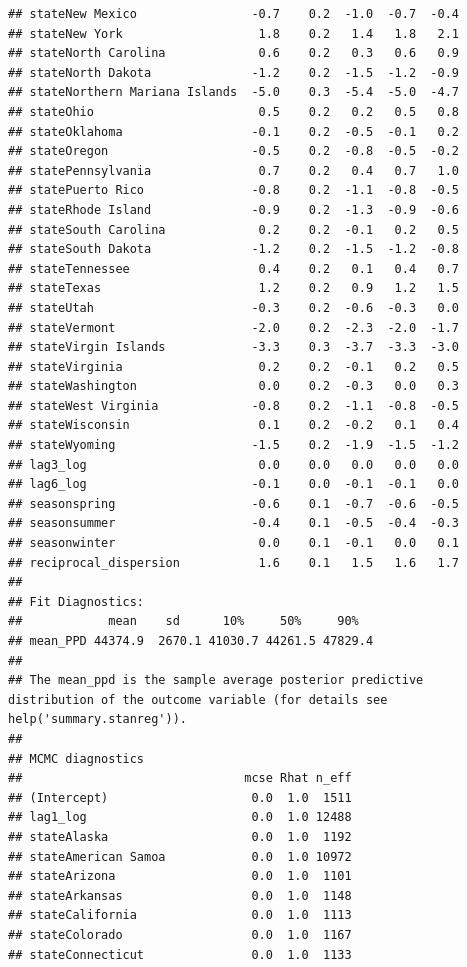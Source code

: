 \documentclass[
]{book}
\begin{document}
\begin{verbatim}
## stateNew Mexico                -0.7    0.2  -1.0  -0.7  -0.4
## stateNew York                   1.8    0.2   1.4   1.8   2.1
## stateNorth Carolina             0.6    0.2   0.3   0.6   0.9
## stateNorth Dakota              -1.2    0.2  -1.5  -1.2  -0.9
## stateNorthern Mariana Islands  -5.0    0.3  -5.4  -5.0  -4.7
## stateOhio                       0.5    0.2   0.2   0.5   0.8
## stateOklahoma                  -0.1    0.2  -0.5  -0.1   0.2
## stateOregon                    -0.5    0.2  -0.8  -0.5  -0.2
## statePennsylvania               0.7    0.2   0.4   0.7   1.0
## statePuerto Rico               -0.8    0.2  -1.1  -0.8  -0.5
## stateRhode Island              -0.9    0.2  -1.3  -0.9  -0.6
## stateSouth Carolina             0.2    0.2  -0.1   0.2   0.5
## stateSouth Dakota              -1.2    0.2  -1.5  -1.2  -0.8
## stateTennessee                  0.4    0.2   0.1   0.4   0.7
## stateTexas                      1.2    0.2   0.9   1.2   1.5
## stateUtah                      -0.3    0.2  -0.6  -0.3   0.0
## stateVermont                   -2.0    0.2  -2.3  -2.0  -1.7
## stateVirgin Islands            -3.3    0.3  -3.7  -3.3  -3.0
## stateVirginia                   0.2    0.2  -0.1   0.2   0.5
## stateWashington                 0.0    0.2  -0.3   0.0   0.3
## stateWest Virginia             -0.8    0.2  -1.1  -0.8  -0.5
## stateWisconsin                  0.1    0.2  -0.2   0.1   0.4
## stateWyoming                   -1.5    0.2  -1.9  -1.5  -1.2
## lag3_log                        0.0    0.0   0.0   0.0   0.0
## lag6_log                       -0.1    0.0  -0.1  -0.1   0.0
## seasonspring                   -0.6    0.1  -0.7  -0.6  -0.5
## seasonsummer                   -0.4    0.1  -0.5  -0.4  -0.3
## seasonwinter                    0.0    0.1  -0.1   0.0   0.1
## reciprocal_dispersion           1.6    0.1   1.5   1.6   1.7
## 
## Fit Diagnostics:
##            mean    sd      10%     50%     90%  
## mean_PPD 44374.9  2670.1 41030.7 44261.5 47829.4
## 
## The mean_ppd is the sample average posterior predictive distribution of the outcome variable (for details see help('summary.stanreg')).
## 
## MCMC diagnostics
##                               mcse Rhat n_eff
## (Intercept)                    0.0  1.0  1511
## lag1_log                       0.0  1.0 12488
## stateAlaska                    0.0  1.0  1192
## stateAmerican Samoa            0.0  1.0 10972
## stateArizona                   0.0  1.0  1101
## stateArkansas                  0.0  1.0  1148
## stateCalifornia                0.0  1.0  1113
## stateColorado                  0.0  1.0  1167
## stateConnecticut               0.0  1.0  1133

\end{verbatim}
\end{document}
